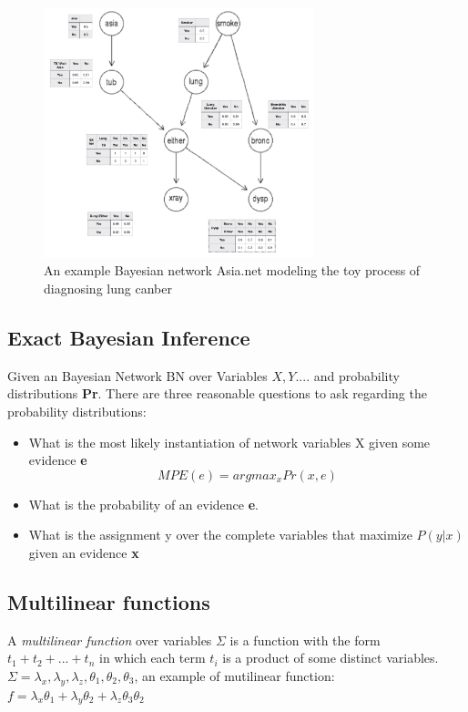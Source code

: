     \begin{figure}
        \centering
        \includegraphics[width = 0.7\textwidth]{pic/full-asia.png}
        \caption{An example Bayesian network Asia.net modeling the toy process of diagnosing lung canber}
        \label{fig:asia-net}
    \end{figure}
    
    \subsection{Exact Bayesian Inference}
    Given an Bayesian Network BN over Variables ${X, Y...}$. and probability distributions \textbf{Pr}. There are three reasonable questions to ask regarding the probability distributions:
    \begin{itemize}
        \item What is the most likely instantiation of network variables X given some evidence \textbf{e}
        $$MPE(e) = argmax_{x} Pr(x, e)$$
        \item What is the probability of an evidence \textbf{e}.
        \item What is the assignment y over the complete variables that maximize $P(y|x)$ given an evidence \textbf{x}
    \end{itemize}
    \subsection{Multi\-linear functions}
    A \textit{multi\-linear function} over variables $\Sigma$ is a function
    with the form $t_{1} + t_{2} + ... + t_{n}$ in which each term $t_{i}$ is a product of some distinct variables. \\
    $\Sigma = \lambda_{x}, \lambda_{y}, \lambda_{z}, \theta_{1}, \theta_{2}, \theta_{3}$, an example of muti\-linear function: $f = \lambda_{x}\theta_{1} + \lambda_{y}\theta_{2} + \lambda_{z}\theta_{3}\theta_{2}$\\
    

